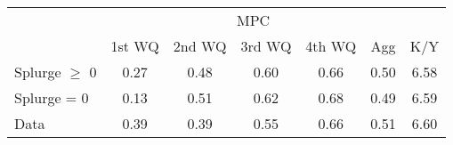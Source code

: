 \begin{tabular}{@{}lcccccc@{}} 
\toprule 
                  & \multicolumn{5}{c}{MPC} &   \\   
                  &  1st WQ  & 2nd WQ  & 3rd WQ & 4th WQ  & Agg  &  K/Y  \\  \midrule 
Splurge $\geq$ 0 &0.27 & 0.48 & 0.60 & 0.66 & 0.50 & 6.58 \\ 
Splurge = 0 &0.13 & 0.51 & 0.62 & 0.68 & 0.49 & 6.59 \\ 
Data &0.39 & 0.39 & 0.55 & 0.66 & 0.51 & 6.60 \\ 
\end{tabular}  
